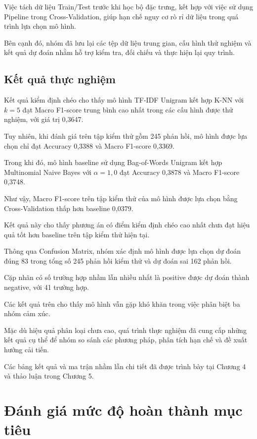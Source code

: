 Việc tách dữ liệu Train/Test trước khi học
bộ đặc trưng, kết hợp với việc sử dụng
Pipeline trong Cross-Validation, giúp hạn
chế nguy cơ rò rỉ dữ liệu trong quá trình
lựa chọn mô hình.

Bên cạnh đó, nhóm đã lưu lại các tệp dữ liệu
trung gian, cấu hình thử nghiệm và kết quả
dự đoán nhằm hỗ trợ kiểm tra, đối chiếu
và thực hiện lại quy trình.


\subsection{Kết quả thực nghiệm}

Kết quả kiểm định chéo cho thấy mô hình
TF-IDF Unigram kết hợp K-NN với $k=5$
đạt Macro F1-score trung bình cao nhất
trong các cấu hình được thử nghiệm,
với giá trị 0,3647.

Tuy nhiên, khi đánh giá trên tập kiểm thử
gồm 245 phản hồi, mô hình được lựa chọn
chỉ đạt Accuracy 0,3388 và Macro F1-score
0,3369.

Trong khi đó, mô hình baseline sử dụng
Bag-of-Words Unigram kết hợp Multinomial
Naive Bayes với $\alpha=1,0$ đạt
Accuracy 0,3878 và Macro F1-score 0,3748.

Như vậy, Macro F1-score trên tập kiểm thử
của mô hình được lựa chọn bằng Cross-Validation
thấp hơn baseline 0,0379.

Kết quả này cho thấy phương án có điểm
kiểm định chéo cao nhất chưa đạt hiệu quả
tốt hơn baseline trên tập kiểm thử hiện tại.

Thông qua Confusion Matrix, nhóm xác định
mô hình được lựa chọn dự đoán đúng 83
trong tổng số 245 phản hồi kiểm thử
và dự đoán sai 162 phản hồi.

Cặp nhãn có số trường hợp nhầm lẫn
nhiều nhất là positive được dự đoán
thành negative, với 41 trường hợp.

Các kết quả trên cho thấy mô hình vẫn
gặp khó khăn trong việc phân biệt
ba nhóm cảm xúc.

Mặc dù hiệu quả phân loại chưa cao,
quá trình thực nghiệm đã cung cấp
những kết quả cụ thể để nhóm so sánh
các phương pháp, phân tích hạn chế
và đề xuất hướng cải tiến.

Các bảng kết quả và ma trận nhầm lẫn
chi tiết đã được trình bày tại
Chương 4 và thảo luận trong Chương 5.



\section{Đánh giá mức độ hoàn thành mục tiêu}

